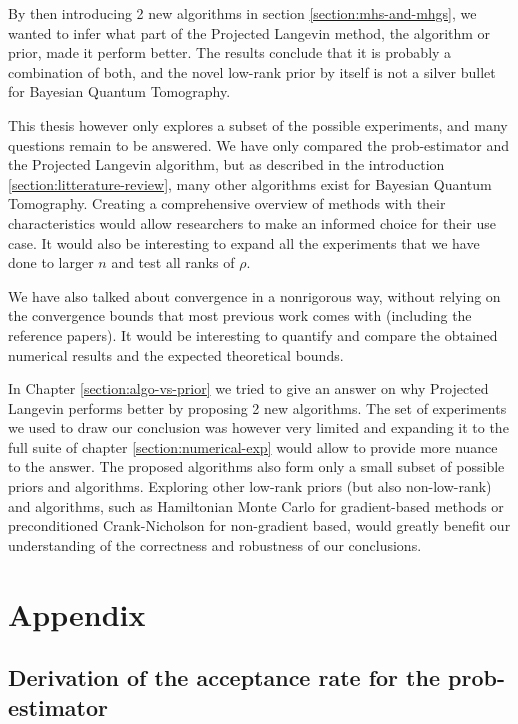 \documentclass[12pt]{memoir}
\begin{document}
By then introducing 2 new algorithms in section \ref{section:mhs-and-mhgs}, we wanted to infer what part of the Projected Langevin method, the algorithm or prior, made it perform better. The results conclude that it is probably a combination of both, and the novel low-rank prior by itself is not a silver bullet for Bayesian Quantum Tomography.\medbreak


This thesis however only explores a subset of the possible experiments, and many questions remain to be answered. We have only compared the prob-estimator and the Projected Langevin algorithm, but as described in the introduction \ref{section:litterature-review}, many other algorithms exist for Bayesian Quantum Tomography. Creating a comprehensive overview of methods with their characteristics would allow researchers to make an informed choice for their use case. It would also be interesting to expand all the experiments that we have done to larger $n$ and test all ranks of $\rho$. \medbreak


We have also talked about convergence in a nonrigorous way, without relying on the convergence bounds that most previous work comes with (including the reference papers). It would be interesting to quantify and compare the obtained numerical results and the expected theoretical bounds.\medbreak


In Chapter \ref{section:algo-vs-prior} we tried to give an answer on why Projected Langevin performs better by proposing 2 new algorithms. The set of experiments we used to draw our conclusion was however very limited and expanding it to the full suite of chapter \ref{section:numerical-exp} would allow to provide more nuance to the answer. The proposed algorithms also form only a small subset of possible priors and algorithms. Exploring other low-rank priors (but also non-low-rank) and algorithms, such as Hamiltonian Monte Carlo for gradient-based methods or preconditioned Crank-Nicholson for non-gradient based, would greatly benefit our understanding of the correctness and robustness of our conclusions.


% 

% 

\printbibliography


\chapter*{Appendix}

\section*{Derivation of the acceptance rate for the prob-estimator}\label{section:appendix:acc-rate-prob}
\end{document}
